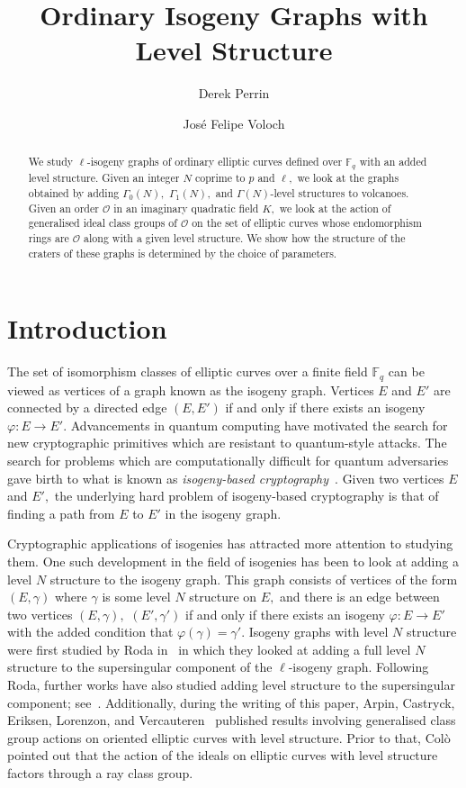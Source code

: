 \documentclass[11pt,a4paper]{amsart}
\title{Ordinary Isogeny Graphs with Level Structure}
\author{Derek Perrin}
\author{Jos\'e Felipe Voloch}
\theoremstyle{plain}
\theoremstyle{definition}
\theoremstyle{remark}
\begin{document}
\maketitle

\begin{abstract}
  We study $\ell$-isogeny graphs of ordinary elliptic curves defined over $\mathbb{F}_q$ with an added level structure. Given an integer $N$ coprime to $p$ and $\ell,$ we look at the graphs obtained by adding $\Gamma_0(N),$ $\Gamma_1(N),$ and $\Gamma(N)$-level structures to volcanoes. Given an order $\mathcal{O}$ in an imaginary quadratic field $K,$ we look at the action of generalised ideal class groups of $\mathcal{O}$ on the set of elliptic curves whose endomorphism rings are $\mathcal{O}$ along with a given level structure. We show how the structure of the craters of these graphs is determined by the choice of parameters.
\end{abstract}

\section{Introduction}\label{sec:introduction}
 The set of isomorphism classes of elliptic curves over a finite field $\mathbb{F}_q$ can be viewed as vertices of a graph known as the isogeny graph. Vertices $E$ and $E'$ are connected by a directed edge $(E, E')$ if and only if there exists an isogeny $\varphi: E \to E'.$ Advancements in quantum computing have motivated the search for new cryptographic primitives which are resistant to quantum-style attacks. The search for problems which are computationally difficult for quantum adversaries gave birth to what is known as \emph{isogeny-based cryptography}~\cite{charles-lauter-goren}. Given two vertices $E$ and $E',$ the underlying hard problem of isogeny-based cryptography is that of finding a path from $E$ to $E'$ in the isogeny graph.

Cryptographic applications of isogenies has attracted more attention to studying them. One such development in the field of isogenies has been to look at adding a level $N$ structure to the isogeny graph. This graph consists of vertices of the form $(E, \gamma)$ where $\gamma$ is some level $N$ structure on $E,$ and there is an edge between two vertices $(E, \gamma),$ $(E', \gamma')$ if and only if there exists an isogeny $\varphi: E \to E'$ with the added condition that $\varphi(\gamma) = \gamma'.$ Isogeny graphs with level $N$ structure were first studied by Roda in~\cite{Roda-thesis} in which they looked at adding a full level $N$ structure to the supersingular component of the $\ell$-isogeny graph. Following Roda, further works have also studied adding level structure to the supersingular component; see~\cite{Shai,Arpin-level-structure}. Additionally, during the writing of this paper, Arpin, Castryck, Eriksen, Lorenzon, and Vercauteren~\cite{class-group-action-oriented} published results involving generalised class group actions on oriented elliptic curves with level structure. Prior to that, Col\`o~\cite{Colo} pointed out that the action of the ideals on elliptic curves with level structure factors through a ray class group.
\end{document}
